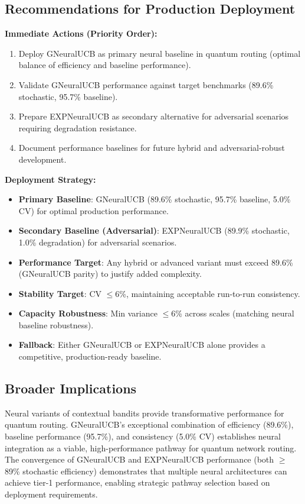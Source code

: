 \documentclass[12pt,a4paper]{article}
\begin{document}
\subsection{Recommendations for Production Deployment}

\textbf{Immediate Actions (Priority Order):}
\begin{enumerate}
\item Deploy GNeuralUCB as primary neural baseline in quantum routing (optimal balance of efficiency and baseline performance).
\item Validate GNeuralUCB performance against target benchmarks (89.6\% stochastic, 95.7\% baseline).
\item Prepare EXPNeuralUCB as secondary alternative for adversarial scenarios requiring degradation resistance.
\item Document performance baselines for future hybrid and adversarial-robust development.
\end{enumerate}

\textbf{Deployment Strategy:}
\begin{itemize}
\item \textbf{Primary Baseline}: GNeuralUCB (89.6\% stochastic, 95.7\% baseline, 5.0\% CV) for optimal production performance.
\item \textbf{Secondary Baseline (Adversarial)}: EXPNeuralUCB (89.9\% stochastic, 1.0\% degradation) for adversarial scenarios.
\item \textbf{Performance Target}: Any hybrid or advanced variant must exceed 89.6\% (GNeuralUCB parity) to justify added complexity.
\item \textbf{Stability Target}: CV $\leq$6\%, maintaining acceptable run-to-run consistency.
\item \textbf{Capacity Robustness}: Min variance $\leq$6\% across scales (matching neural baseline robustness).
\item \textbf{Fallback}: Either GNeuralUCB or EXPNeuralUCB alone provides a competitive, production-ready baseline.
\end{itemize}

\subsection{Broader Implications}

Neural variants of contextual bandits provide transformative performance for quantum routing. GNeuralUCB's exceptional combination of efficiency (89.6\%), baseline performance (95.7\%), and consistency (5.0\% CV) establishes neural integration as a viable, high-performance pathway for quantum network routing. The convergence of GNeuralUCB and EXPNeuralUCB performance (both $\geq$89\% stochastic efficiency) demonstrates that multiple neural architectures can achieve tier-1 performance, enabling strategic pathway selection based on deployment requirements.
\end{document}
